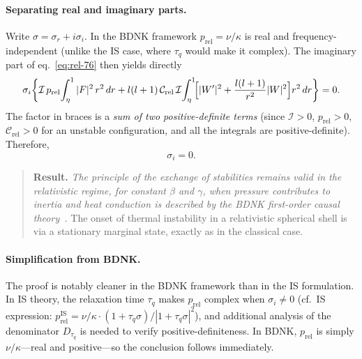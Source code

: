 \paragraph{Separating real and imaginary parts.}
Write $\sigma = \sigma_{r} + i\sigma_{i}$.  In the BDNK framework
$p_{\mathrm{rel}} = \nu/\kappa$ is real and frequency-independent
(unlike the IS case, where $\tau_{q}$ would make it complex).
The imaginary part of eq.~\eqref{eq:rel-76} then yields directly
\begin{equation}
  \sigma_{i}\!\left\{
    \mathcal{I}\,p_{\mathrm{rel}}\!
    \int_{\eta}^{1}|F|^{2}\,r^{2}\,dr
    + l(l+1)\,\mathcal{C}_{\mathrm{rel}}\,\mathcal{I}\!
      \int_{\eta}^{1}\!\Bigl[|W'|^{2}
        + \frac{l(l+1)}{r^{2}}|W|^{2}\Bigr]r^{2}\,dr
  \right\} = 0.
  \label{eq:rel-77}
\end{equation}
The factor in braces is a \emph{sum of two positive-definite terms}
(since $\mathcal{I} > 0$, $p_{\mathrm{rel}} > 0$,
$\mathcal{C}_{\mathrm{rel}} > 0$ for an
unstable configuration, and all the integrals are
positive-definite).  Therefore,
\begin{equation}
  \boxed{\sigma_{i} = 0.}
  \label{eq:rel-78}
\end{equation}

\begin{quote}
\textbf{Result.}  \emph{The principle of the exchange of stabilities
remains valid in the relativistic regime, for constant $\beta$ and
$\gamma$, when pressure contributes to inertia and heat conduction
is described by the BDNK first-order causal
theory~\cite{BemficaDN2018,Kovtun2019}.}  The onset of
thermal instability in a relativistic spherical shell is via a
stationary marginal state, exactly as in the classical case.
\end{quote}

\paragraph{Simplification from BDNK.}
The proof is notably cleaner in the BDNK framework than in the IS
formulation.  In IS theory, the relaxation time $\tau_{q}$ makes
$p_{\mathrm{rel}}$ complex when $\sigma_{i} \neq 0$ (cf.\ IS
expression: $p_{\mathrm{rel}}^{\mathrm{IS}} = \nu/\kappa \cdot
(1 + \tau_{q}\sigma)/|1 + \tau_{q}\sigma|^{2}$), and additional
analysis of the denominator $D_{\tau_{q}}$ is needed to verify
positive-definiteness.  In BDNK, $p_{\mathrm{rel}}$ is simply
$\nu/\kappa$---real and positive---so the conclusion follows
immediately.

